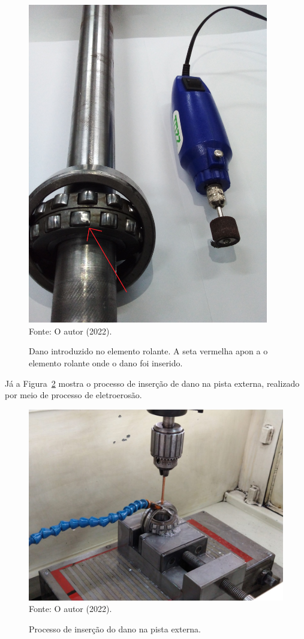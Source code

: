 \documentclass[
	12pt,				
	oneside,			
	a4paper,			
	english,			
	brazil,			
	]{abntex2ppgsi}
\begin{document}
\begin{figure}[H]
\centering
\caption {Dano introduzido no elemento rolante. A seta vermelha apon
a o elemento rolante onde o dano foi inserido.}
\includegraphics[width=\textwidth,height=140mm,keepaspectratio]{dano_introduzido_rolante} \\
Fonte: O autor (2022).
\label{dano_introduzido_rolante}
\end{figure}

Já a Figura~\ref{insercao_dano_pista_externa} mostra o processo de inserção de dano na pista externa, realizado por meio de processo de eletroerosão.

\begin{figure}[H]
\centering
\caption {Processo de inserção do dano na pista externa.}
\includegraphics[width=\textwidth,keepaspectratio]{insercao_dano_pista_externa} \\
Fonte: O autor (2022).
\label{insercao_dano_pista_externa}
\end{figure}
\end{document}
